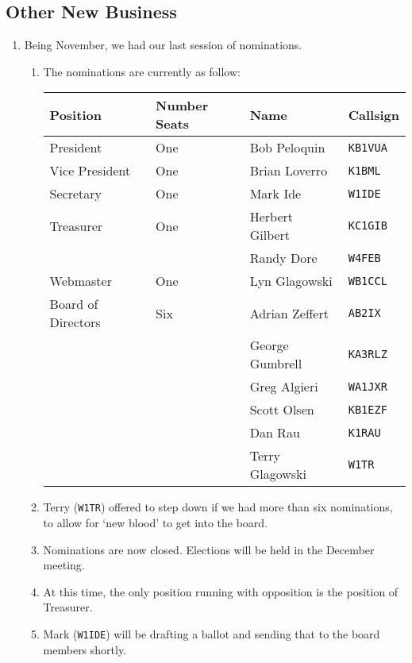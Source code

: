 \documentclass[10pt,letterpaper]{article}
\begin{document}
\subsection{Other New Business}
\begin{enumerate}
  \item Being November, we had our last session of nominations.
  \begin{enumerate}
  \item The nominations are currently as follow:\\
    \begin{tabular}{|l|l|l|l|}
      \hline
      \textbf{Position}  & \textbf{Number Seats} & \textbf{Name}     & \textbf{Callsign} \\ \hline
      President          & One                   & Bob Peloquin      & \texttt{KB1VUA}   \\ \hline
      Vice President     & One                   & Brian Loverro     & \texttt{K1BML}    \\ \hline
      Secretary          & One                   & Mark Ide          & \texttt{W1IDE}    \\ \hline
      Treasurer          & One                   & Herbert Gilbert   & \texttt{KC1GIB}   \\
                         &                       & Randy Dore        & \texttt{W4FEB}    \\ \hline
      Webmaster          & One                   & Lyn Glagowski     & \texttt{WB1CCL}   \\ \hline
      Board of Directors & Six                   & Adrian Zeffert    & \texttt{AB2IX}    \\
                         &                       & George Gumbrell   & \texttt{KA3RLZ}   \\
                         &                       & Greg Algieri      & \texttt{WA1JXR}   \\
                         &                       & Scott Olsen       & \texttt{KB1EZF}   \\
                         &                       & Dan Rau           & \texttt{K1RAU}    \\
                         &                       & Terry Glagowski   & \texttt{W1TR}     \\ \hline

    \end{tabular}
    \item Terry (\texttt{W1TR}) offered to step down if we had more than six nominations, to allow for `new blood' to get into the board.
    \item Nominations are now closed. Elections will be held in the December meeting.
    \item At this time, the only position running with opposition is the position of Treasurer.
    \item Mark (\texttt{W1IDE}) will be drafting a ballot and sending that to the board members shortly.
  \end{enumerate}


\end{enumerate}
\end{document}
